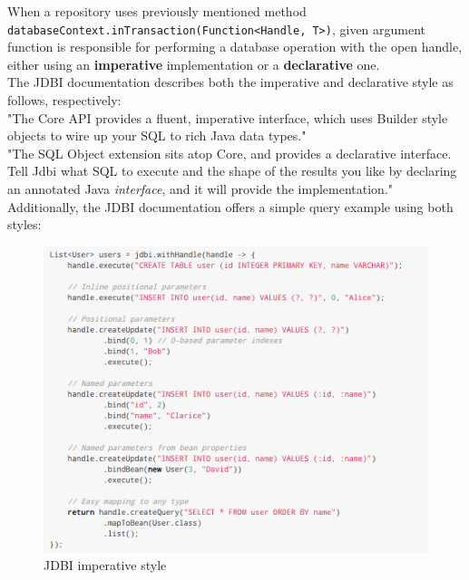 When a repository uses previously mentioned method\\
\texttt{databaseContext.inTransaction(Function<Handle, T>)}, given argument function is responsible
for performing a database operation with the open handle, either using an \textbf{imperative} implementation or a \textbf{declarative} one.\\

The JDBI documentation describes both the imperative and declarative style as follows, respectively:\\

"The Core API provides a fluent, imperative interface, which uses Builder style objects to wire up your SQL to rich Java data types."\\

"The SQL Object extension sits atop Core, and provides a declarative interface. Tell Jdbi what SQL to execute and the shape of the results
you like by declaring an annotated Java \textit{interface}, and it will provide the implementation."\\

Additionally, the JDBI documentation offers a simple query example using both styles:\\

\begin{figure}[H]
    \begin{center}
        \includegraphics[scale=0.5]{_figures/imperative.png}
        \caption{JDBI imperative style}
    \end{center}
\end{figure}

